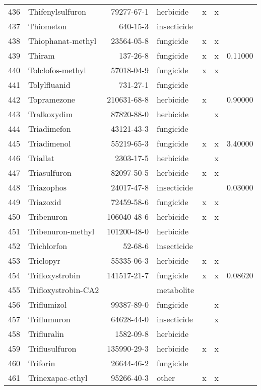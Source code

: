 \begin{longtable}{lp{4cm}rlp{1.3cm}p{1.3cm}p{1.5cm}}
  436 & Thifenylsulfuron & 79277-67-1 & herbicide & x & x &  \\ 
  437 & Thiometon & 640-15-3 & insecticide &  &  &  \\ 
  438 & Thiophanat-methyl & 23564-05-8 & fungicide & x & x &  \\ 
  439 & Thiram & 137-26-8 & fungicide & x & x & 0.11000 \\ 
  440 & Tolclofos-methyl & 57018-04-9 & fungicide & x & x &  \\ 
  441 & Tolylfluanid & 731-27-1 & fungicide &  &  &  \\ 
  442 & Topramezone & 210631-68-8 & herbicide & x &  & 0.90000 \\ 
  443 & Tralkoxydim & 87820-88-0 & herbicide &  & x &  \\ 
  444 & Triadimefon & 43121-43-3 & fungicide &  &  &  \\ 
  445 & Triadimenol & 55219-65-3 & fungicide & x & x & 3.40000 \\ 
  446 & Triallat & 2303-17-5 & herbicide &  & x &  \\ 
  447 & Triasulfuron & 82097-50-5 & herbicide & x & x &  \\ 
  448 & Triazophos & 24017-47-8 & insecticide &  &  & 0.03000 \\ 
  449 & Triazoxid & 72459-58-6 & fungicide & x & x &  \\ 
  450 & Tribenuron & 106040-48-6 & herbicide & x & x &  \\ 
  451 & Tribenuron-methyl & 101200-48-0 & herbicide &  &  &  \\ 
  452 & Trichlorfon & 52-68-6 & insecticide &  &  &  \\ 
  453 & Triclopyr & 55335-06-3 & herbicide & x & x &  \\ 
  454 & Trifloxystrobin & 141517-21-7 & fungicide & x & x & 0.08620 \\ 
  455 & Trifloxystrobin-CA2 &  & metabolite &  &  &  \\ 
  456 & Triflumizol & 99387-89-0 & fungicide &  & x &  \\ 
  457 & Triflumuron & 64628-44-0 & insecticide &  & x &  \\ 
  458 & Trifluralin & 1582-09-8 & herbicide &  &  &  \\ 
  459 & Triflusulfuron & 135990-29-3 & herbicide & x & x &  \\ 
  460 & Triforin & 26644-46-2 & fungicide &  &  &  \\ 
  461 & Trinexapac-ethyl & 95266-40-3 & other & x & x &  \\ 

\end{longtable}
